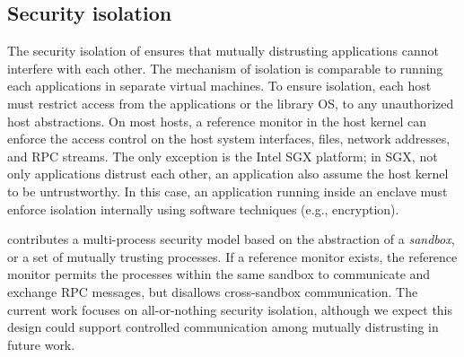 \subsection{Security isolation}
\label{sec:overview:host:security}


The security isolation of \graphene{} ensures that mutually distrusting applications cannot interfere with each other. The mechanism of isolation is comparable to running each applications in separate virtual machines.
To ensure isolation, each host must restrict access from the applications or the library OS, to any unauthorized host abstractions.
On most hosts, a reference monitor in the host kernel can enforce the access control on the host system interfaces, files, network addresses, and RPC streams.
The only exception is the Intel SGX platform; in SGX, not only applications distrust each other, an application also assume the host kernel to be untrustworthy.
In this case, an application running inside an enclave must enforce isolation internally using software techniques (e.g., encryption).


\graphene{} contributes a multi-process security model 
based on the abstraction of a \emph{sandbox},
or a set of mutually trusting processes.
If a reference monitor exists, the reference monitor permits the processes within the same sandbox to communicate and exchange RPC messages, but disallows cross-sandbox communication.
The current work focuses on all-or-nothing security isolation, although we expect
this design could support
controlled communication among mutually distrusting \liboses{}
in future work.

